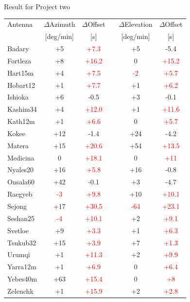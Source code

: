 \documentclass{beamer}
\begin{document}
    \begin{frame}{Result for Project two}
        \begin{tabular}{l c c c c c}
            Antenna & $\Delta$Azimuth & $\Delta$Offset & & $\Delta$Elevation & $\Delta$Offset\\ [-8pt]
               & \tiny{[deg/min]}      & \tiny{[s]}            & & \tiny{[deg/min]} & \tiny{[s]} \\
            \hline
            Badary            & +5  & \textcolor{red}{+7.3} &  & +5  & -5.4  \\
            Fortleza          & +8  & \textcolor{red}{+16.2} &  & 0&\textcolor{red}{+15.2}  \\
            Hart15m           & +4  & \textcolor{red}{+7.5}  &  &\textcolor{red}{-2} &\textcolor{red}{+5.7}   \\
            Hobart12          & +1  & \textcolor{red}{+7.7}  &  & +1&\textcolor{red}{+6.2}   \\
            Ishioka           & +6  & -0.5  &  & +3 & -0.1   \\
            Kashim34          & +4  & \textcolor{red}{+12.0} &  & +1 &\textcolor{red}{+11.6}  \\
            Kath12m           & +1  & \textcolor{red}{+6.6}  &  & 0 &\textcolor{red}{+5.7}   \\
            Kokee             & +12 & -1.4  &  & +24&-4.2   \\
            Matera            & +15 & \textcolor{red}{+20.6} &  & +54&\textcolor{red}{+13.5}  \\
            Medicina          & 0  & \textcolor{red}{+18.1} &  & 0&\textcolor{red}{+11}  \\
            Nyales20          & +16 & \textcolor{red}{+5.8}  &  & +16& -0.8  \\
            Onsala60          & +42 & -0.1  &  & +3 &-4.7   \\
            Raegyeb           & \textcolor{red}{-3}  & \textcolor{red}{+9.8} & & +10  &\textcolor{red}{+10.1}  \\
            Sejong            & +17 & \textcolor{red}{+30.5} &  &\textcolor{red}{-64}& \textcolor{red}{+23.1}  \\
            Seshan25          & \textcolor{red}{-4}  & \textcolor{red}{+10.1} & & +2  &\textcolor{red}{+9.1}  \\
            Svetloe           & +9  & \textcolor{red}{+3.3} &  & +1 &\textcolor{red}{+6.3}  \\
            Tsukub32          & +15 & \textcolor{red}{+3.9}  &  & +7 &\textcolor{red}{+1.3}   \\
            Urumqi            & +1  & \textcolor{red}{+11.3} &  & +2&\textcolor{red}{+9.9}  \\
            Yarra12m          & +1  & \textcolor{red}{+6.9}  &  & 0  &\textcolor{red}{+6.4}   \\
            Yebes40m          & +63 & \textcolor{red}{+15.4} &  & 0&\textcolor{red}{+8}  \\
            Zelenchk          & +1  & \textcolor{red}{+15.9} &  & +2&\textcolor{red}{+2.8}  \\
        \end{tabular}
    \end{frame}
\end{document}
